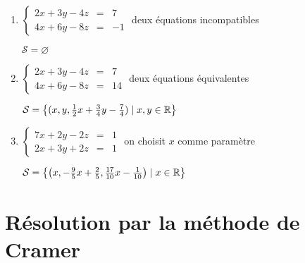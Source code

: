 \begin{frame}
\begin{exemple}
\begin{enumerate}\setlength{\itemsep}{12pt}
  \item $\left\{\begin{array}{rcl} 
2 x + 3 y - 4 z  & = & 7 \\
4 x + 6 y - 8 z  & = & -1
\end{array}\right.$ \hfill deux équations incompatibles

\centerline{$\mathcal{S}= \varnothing$}

 \pause

  \item $\left\{\begin{array}{rcl} 
2 x + 3 y - 4 z  & = & 7 \\
4 x + 6 y - 8 z  & = & 14
 \end{array}\right.$  \hfill deux équations équivalentes
 
\centerline{$\mathcal{S}= \big\lbrace (x,y,\frac12 x + \frac34 y - \frac74) \mid x,y\in \mathbb{R} \big\rbrace$}
  \pause

 \item $\left\{\begin{array}{rcl} 
7 x + 2 y - 2 z  & = & 1 \\
2 x + 3 y + 2 z  & = & 1
 \end{array}\right.$ \hfill on choisit $x$ comme paramètre
 
\centerline{$\mathcal{S}= \left\lbrace \left(x,-\frac{9}{5} x +  \frac25,\frac{17}{10}x-\frac{1}{10}\right) \mid x\in \mathbb{R} \right\rbrace$}

\end{enumerate}
  
  
\end{exemple}

\end{frame}


\section{Résolution par la méthode de Cramer}

